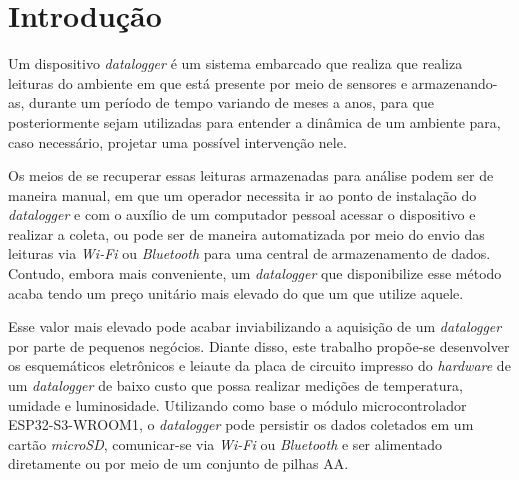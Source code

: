 \chapter{Introdução}
\label{cap:introducao}






Um dispositivo \textit{datalogger} é um sistema embarcado que realiza que realiza leituras do ambiente em que está presente por meio de sensores e armazenando-as, durante um período de tempo variando de meses a anos, para que posteriormente sejam utilizadas para entender a dinâmica de um ambiente para, caso necessário, projetar uma possível intervenção nele.

Os meios de se recuperar essas leituras armazenadas para análise podem ser de maneira manual, em que um operador necessita ir ao ponto de instalação do \textit{datalogger} e com o auxílio de um computador pessoal acessar o dispositivo e realizar a coleta, ou pode ser de maneira automatizada por meio do envio das leituras via \textit{Wi-Fi} ou \textit{Bluetooth} para uma central de armazenamento de dados. Contudo, embora mais conveniente, um \textit{datalogger} que disponibilize esse método acaba tendo um preço unitário mais elevado do que um que utilize aquele. 

Esse valor mais elevado pode acabar inviabilizando a aquisição de um \textit{datalogger} por parte de pequenos negócios. Diante disso, este trabalho propõe-se desenvolver os esquemáticos eletrônicos e leiaute da placa de circuito impresso do \textit{hardware} de um \textit{datalogger} de baixo custo que possa realizar medições de temperatura, umidade e luminosidade. Utilizando como base o módulo microcontrolador ESP32-S3-WROOM1, o \textit{datalogger} pode persistir os dados coletados em um cartão \textit{microSD}, comunicar-se via \textit{Wi-Fi} ou \textit{Bluetooth} e ser alimentado diretamente ou por meio de um conjunto de pilhas AA. 












